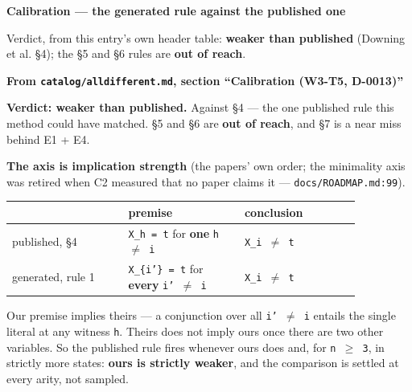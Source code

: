 \documentclass[10pt,a4paper]{article}
\newenvironment{calblock}{%
  \par\smallskip
  \def\FrameCommand{\textcolor{calbar}{\vrule width 1pt}\hspace{9pt}}%
  \MakeFramed{\advance\hsize-\width\FrameRestore}}%
  {\endMakeFramed\par\smallskip}
\newcommand{\calhead}[1]{{\sffamily\bfseries\large\textcolor{calbar}{#1}\par}}
\newcommand{\litsubsub}[1]{\par{\sffamily\bfseries\small #1\par}}
\begin{document}
\begin{calblock}
\calhead{Calibration --- the generated rule against the published one}
{\small\sffamily Verdict, from this entry's own header table: \textbf{weaker than published} (Downing et al. \S{}4); the \S{}5 and \S{}6 rules are \textbf{out of reach}.\par}
\litsubsub{From \texttt{catalog/alldifferent.md}, section ``Calibration (W3-T5, D-0013)''}
\textbf{Verdict: weaker than published.} Against \S{}4 --- the one published rule this method could have matched. \S{}5 and \S{}6 are \textbf{out of reach}, and \S{}7 is a near miss behind E1 + E4.

\textbf{The axis is implication strength} (the papers' own order; the minimality axis was retired when C2 measured that no paper claims it --- \texttt{docs/ROADMAP.md:99}).

{\small\setlength{\tabcolsep}{3pt}
\begin{tabular}{@{}>{\raggedright\arraybackslash}p{0.287\linewidth}>{\raggedright\arraybackslash}p{0.287\linewidth}>{\raggedright\arraybackslash}p{0.287\linewidth}@{}}
\hline
 & \textbf{premise} & \textbf{conclusion} \\
\hline
published, \S{}4 & \texttt{X\_h = t} for \textbf{one} \texttt{h $\neq$ i} & \texttt{X\_i $\neq$ t} \\
generated, rule 1 & \texttt{X\_\{i'\} = t} for \textbf{every} \texttt{i' $\neq$ i} & \texttt{X\_i $\neq$ t} \\
\hline
\end{tabular}\par}
Our premise implies theirs --- a conjunction over all \texttt{i' $\neq$ i} entails the single literal at any witness \texttt{h}. Theirs does not imply ours once there are two other variables. So the published rule fires whenever ours does and, for \texttt{n $\geq$ 3}, in strictly more states: \textbf{ours is strictly weaker}, and the comparison is settled at every arity, not sampled.


\end{calblock}
\end{document}
